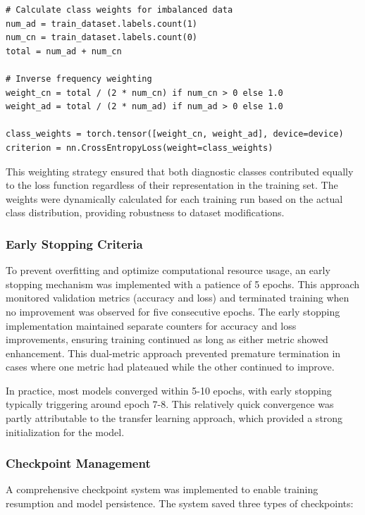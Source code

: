\documentclass[12pt, a4paper]{article}
\begin{document}
\begin{verbatim}
# Calculate class weights for imbalanced data
num_ad = train_dataset.labels.count(1)
num_cn = train_dataset.labels.count(0)
total = num_ad + num_cn

# Inverse frequency weighting
weight_cn = total / (2 * num_cn) if num_cn > 0 else 1.0
weight_ad = total / (2 * num_ad) if num_ad > 0 else 1.0

class_weights = torch.tensor([weight_cn, weight_ad], device=device)
criterion = nn.CrossEntropyLoss(weight=class_weights)
\end{verbatim}

This weighting strategy ensured that both diagnostic classes contributed equally to the loss function regardless of their representation in the training set. The weights were dynamically calculated for each training run based on the actual class distribution, providing robustness to dataset modifications.

\subsubsection{Early Stopping Criteria}

To prevent overfitting and optimize computational resource usage, an early stopping mechanism was implemented with a patience of 5 epochs. This approach monitored validation metrics (accuracy and loss) and terminated training when no improvement was observed for five consecutive epochs. The early stopping implementation maintained separate counters for accuracy and loss improvements, ensuring training continued as long as either metric showed enhancement. This dual-metric approach prevented premature termination in cases where one metric had plateaued while the other continued to improve.

In practice, most models converged within 5-10 epochs, with early stopping typically triggering around epoch 7-8. This relatively quick convergence was partly attributable to the transfer learning approach, which provided a strong initialization for the model.

\subsubsection{Checkpoint Management}

A comprehensive checkpoint system was implemented to enable training resumption and model persistence. The system saved three types of checkpoints:
\end{document}
